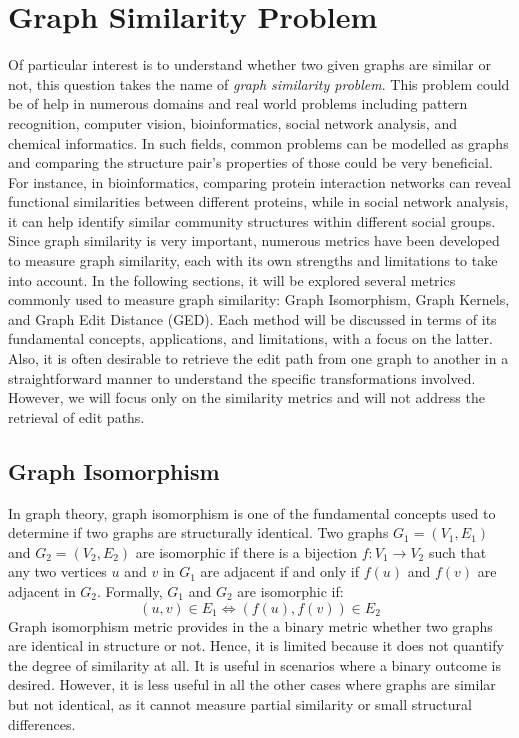 \documentclass[../Thesis.tex]{subfiles}
\begin{document}
	
	\section{Graph Similarity Problem}
	\label{sec:graph_similarity_problem}
	
	Of particular interest is to understand whether two given graphs are similar or not, this question takes the name of \emph{graph similarity problem}. This problem could be of help in numerous domains and real world problems including  pattern recognition, computer vision, bioinformatics, social network analysis, and chemical informatics. In such fields, common problems can be modelled as graphs and comparing the structure pair's properties of those could be very beneficial. For instance, in bioinformatics, comparing protein interaction networks can reveal functional similarities between different proteins, while in social network analysis, it can help identify similar community structures within different social groups. Since graph similarity is very important, numerous metrics have been developed to measure graph similarity, each with its own strengths and limitations to take into account. In the following sections, it will be explored several metrics commonly used to measure graph similarity: Graph Isomorphism, Graph Kernels, and Graph Edit Distance (GED). Each method will be discussed in terms of its fundamental concepts, applications, and limitations, with a focus on the latter. Also, it is often desirable to retrieve the edit path from one graph to another in a straightforward manner to understand the specific transformations involved. However, we will focus only on the similarity metrics and will not address the retrieval of edit paths.
	
	\subsection{Graph Isomorphism}
	
	In graph theory, graph isomorphism is one of the fundamental concepts used to determine if two graphs are structurally identical. Two graphs $G_1 = (V_1, E_1)$ and $G_2 = (V_2, E_2)$ are isomorphic if there is a bijection $f: V_1 \to V_2$ such that any two vertices $u$ and $v$ in $G_1$ are adjacent if and only if $f(u)$ and $f(v)$ are adjacent in $G_2$. Formally, $G_1$ and $G_2$ are isomorphic if:
	\[
	(u, v) \in E_1 \Leftrightarrow (f(u), f(v)) \in E_2
	\]
	Graph isomorphism metric provides in the a binary metric whether two graphs are identical in structure or not. Hence, it is limited because it does not quantify the degree of similarity at all. It is useful in scenarios where a binary outcome is desired. However, it is less useful in all the other cases where graphs are similar but not identical, as it cannot measure partial similarity or small structural differences.
\end{document}
